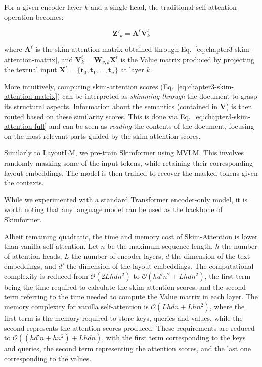 For a given encoder layer $k$ and a single head, the traditional self-attention operation becomes:

\begin{equation}
\label{eq:chapter3-skim-attention-full}
	\bm{Z}'_k = \bm{A}^{\ell} \bm{V}^{t}_{k}
\end{equation}

\noindent where $\bm{A}^{\ell}$ is the skim-attention matrix obtained through Eq.~\ref{eq:chapter3-skim-attention-matrix}, and $\bm{V}^{t}_{k} = \bm{W}_{v,k} \bm{X}^t$ is the Value matrix produced by projecting the textual input $\bm{X}^t = \{\bm{t}_0, \bm{t}_1, …, \bm{t}_n\}$ at layer $k$.

More intuitively, computing skim-attention scores (Eq.~\ref{eq:chapter3-skim-attention-matrix}) can be interpreted as \textit{skimming through} the document to grasp its structural aspects. Information about the semantics (contained in $\bm{V}$) is then routed based on these similarity scores. This is done via Eq.~\ref{eq:chapter3-skim-attention-full} and can be seen as \textit{reading} the contents of the document, focusing on the most relevant parts guided by the skim-attention scores.

Similarly to LayoutLM, we pre-train Skimformer using \ac{MVLM}. This involves randomly masking some of the input tokens, while retaining their corresponding layout embeddings. The model is then trained to recover the masked tokens given the contexts. 


While we experimented with a standard Transformer encoder-only model, it is worth noting that any language model can be used as the backbone of Skimformer.

Albeit remaining quadratic, the time and memory cost of Skim-Attention is lower than vanilla self-attention. Let $n$ be the maximum sequence length, $h$ the number of attention heads, $L$ the number of encoder layers, $d$ the dimension of the text embeddings, and $d'$ the dimension of the layout embeddings. The computational complexity is reduced from $\mathcal{O}(2Lhdn^2)$ to $\mathcal{O}(hd'n^2 + Lhdn^2)$, the first term being the time required to calculate the skim-attention scores, and the second term referring to the time needed to compute the Value matrix in each layer. The memory complexity for vanilla self-attention is $\mathcal{O}(Lhdn + Lhn^2)$, where the first term is the memory required to store keys, queries and values, while the second represents the attention scores produced. These requirements are reduced to $\mathcal{O}((hd’n + hn^2) + Lhdn)$, with the first term corresponding to the keys and queries, the second term representing the attention scores, and the last one corresponding to the values.


